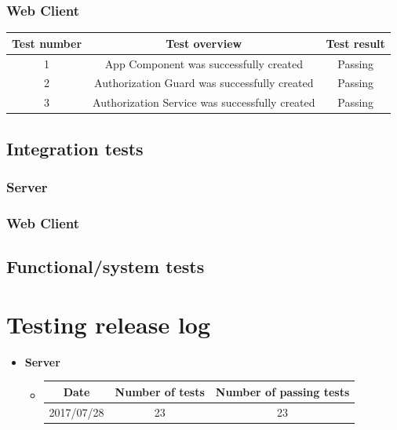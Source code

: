 \documentclass[a4paper,12pt]{article}
\begin{document}
    		\subsubsection{Web Client}
    		
   			\begin{tabular}{ |c|c|c| } 
    			\hline
    			Test number & Test overview & Test result \\
    			\hline
    			1 & App Component was successfully created & Passing\\
    			\hline
    			2 & Authorization Guard was successfully created & Passing\\
    			\hline
    			3 & Authorization Service was successfully created & Passing\\
    			\hline
    		\end{tabular}
    	
        \subsection{Integration tests}
        
        	\subsubsection{Server}
        	
        	\subsubsection{Web Client}
        
        \subsection{Functional/system tests}
	
	\pagebreak
	\section{Testing release log}
	
	\begin{itemize}
		\item \textbf{Server}
		\begin{itemize}
			\item
				\begin{tabular}{ |c|c|c| } 
					\hline
					Date & Number of tests & Number of passing tests \\
					\hline
					2017/07/28 & 23 & 23\\
					\hline
				\end{tabular}
		\end{itemize}
 	\end{itemize}
 
\end{document}
